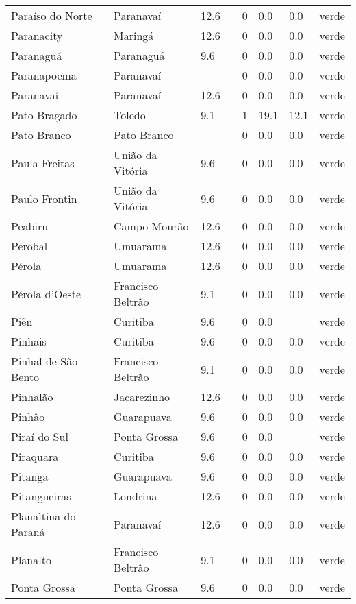 \begin{longtable}{l|lllllll}
  Paraíso do Norte & Paranavaí & 12.6 &  & 0 & 0.0 & 0.0 & verde \\ 
  Paranacity & Maringá & 12.6 &  & 0 & 0.0 & 0.0 & verde \\ 
  Paranaguá & Paranaguá & 9.6 &  & 0 & 0.0 & 0.0 & verde \\ 
  Paranapoema & Paranavaí &  &  & 0 & 0.0 & 0.0 & verde \\ 
  Paranavaí & Paranavaí & 12.6 &  & 0 & 0.0 & 0.0 & verde \\ 
  Pato Bragado & Toledo & 9.1 &  & 1 & 19.1 & 12.1 & verde \\ 
  Pato Branco & Pato Branco &  &  & 0 & 0.0 & 0.0 & verde \\ 
  Paula Freitas & União da Vitória & 9.6 &  & 0 & 0.0 & 0.0 & verde \\ 
  Paulo Frontin & União da Vitória & 9.6 &  & 0 & 0.0 & 0.0 & verde \\ 
  Peabiru & Campo Mourão & 12.6 &  & 0 & 0.0 & 0.0 & verde \\ 
  Perobal & Umuarama & 12.6 &  & 0 & 0.0 & 0.0 & verde \\ 
  Pérola & Umuarama & 12.6 &  & 0 & 0.0 & 0.0 & verde \\ 
  Pérola d'Oeste & Francisco Beltrão & 9.1 &  & 0 & 0.0 & 0.0 & verde \\ 
  Piên & Curitiba & 9.6 &  & 0 & 0.0 &  & verde \\ 
  Pinhais & Curitiba & 9.6 &  & 0 & 0.0 & 0.0 & verde \\ 
  Pinhal de São Bento & Francisco Beltrão & 9.1 &  & 0 & 0.0 & 0.0 & verde \\ 
  Pinhalão & Jacarezinho & 12.6 &  & 0 & 0.0 & 0.0 & verde \\ 
  Pinhão & Guarapuava & 9.6 &  & 0 & 0.0 & 0.0 & verde \\ 
  Piraí do Sul & Ponta Grossa & 9.6 &  & 0 & 0.0 &  & verde \\ 
  Piraquara & Curitiba & 9.6 &  & 0 & 0.0 & 0.0 & verde \\ 
  Pitanga & Guarapuava & 9.6 &  & 0 & 0.0 & 0.0 & verde \\ 
  Pitangueiras & Londrina & 12.6 &  & 0 & 0.0 & 0.0 & verde \\ 
  Planaltina do Paraná & Paranavaí & 12.6 &  & 0 & 0.0 & 0.0 & verde \\ 
  Planalto & Francisco Beltrão & 9.1 &  & 0 & 0.0 & 0.0 & verde \\ 
  Ponta Grossa & Ponta Grossa & 9.6 &  & 0 & 0.0 & 0.0 & verde \\ 

\end{longtable}
